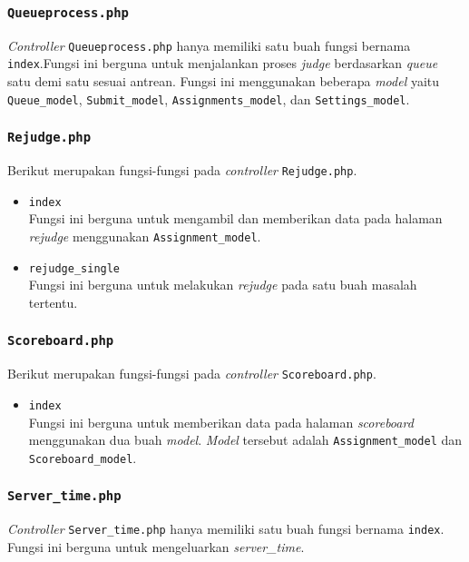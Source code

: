 \subsubsection{\texttt{Queueprocess.php}}
\textit{Controller} \texttt{Queueprocess.php} hanya memiliki satu buah fungsi bernama \texttt{index}.Fungsi ini berguna untuk menjalankan proses \textit{judge} berdasarkan \textit{queue} satu demi satu sesuai antrean. Fungsi ini menggunakan beberapa \textit{model} yaitu \texttt{Queue\_model}, \texttt{Submit\_model}, \texttt{Assignments\_model}, dan \texttt{Settings\_model}.
\subsubsection{\texttt{Rejudge.php}}
Berikut merupakan fungsi-fungsi pada \textit{controller} \texttt{Rejudge.php}.
\begin{itemize}
	\item \texttt{index}\\
	Fungsi ini berguna untuk mengambil dan memberikan data pada halaman \textit{rejudge} menggunakan \texttt{Assignment\_model}.
	\item \texttt{rejudge\_single}\\
	Fungsi ini berguna untuk melakukan \textit{rejudge} pada satu buah masalah tertentu.
\end{itemize}
\subsubsection{\texttt{Scoreboard.php}}
Berikut merupakan fungsi-fungsi pada \textit{controller} \texttt{Scoreboard.php}.
\begin{itemize}
	\item \texttt{index}\\
	Fungsi ini berguna untuk memberikan data pada halaman \textit{scoreboard} menggunakan dua buah \textit{model}. \textit{Model} tersebut adalah \texttt{Assignment\_model} dan \texttt{Scoreboard\_model}.
\end{itemize}
\subsubsection{\texttt{Server\_time.php}}
\textit{Controller} \texttt{Server\_time.php} hanya memiliki satu buah fungsi bernama \texttt{index}. Fungsi ini berguna untuk mengeluarkan \textit{server\_time}.

